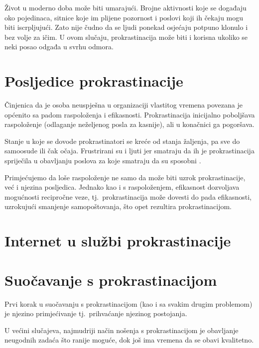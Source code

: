 \documentclass[11pt,twocolumn,english]{article}
\begin{document}
Život u moderno doba može biti umarajući. Brojne aktivnosti koje se
događaju oko pojedinaca, sitnice koje im plijene pozornost i poslovi koji ih
čekaju mogu biti iscrpljujući. Zato nije čudno da se ljudi ponekad osjećaju
potpuno klonulo i bez volje za ičim. U ovom slučaju, prokrastinacija može biti i
korisna ukoliko se neki posao odgađa u svrhu odmora.

\section{Posljedice prokrastinacije}
Činjenica da je osoba neuspješna u organizaciji vlastitog vremena povezana je
općenito sa padom raspoloženja i efikasnosti. Prokrastinacija inicijalno
poboljšava raspoloženje (odlaganje neželjenog posla za kasnije), ali u
konačnici ga pogoršava.

Stanje u koje se dovode prokrastinatori se kreće od
stanja žaljenja, pa sve do samoosude ili čak očaja. Frustrirani su i ljuti jer
smatraju da ih je prokrastinacija spriječila u obavljanju poslova za koje
smatraju da su sposobni \cite{burka2004procrastination}.

Primjećujemo da loše raspoloženje ne samo da može biti
uzrok prokrastinacije, već i njezina posljedica. Jednako kao i s raspoloženjem,
efikasnost dozvoljava mogućnosti recipročne veze, tj.~prokrastinacija može
dovesti do pada efikasnosti, uzrokujući smanjenje samopoštovanja, što opet
rezultira prokrastinacijom.


\section{Internet u službi prokrastinacije}


\section{Suočavanje s prokrastinacijom}

Prvi korak u suočavanju s prokrastinacijom (kao i sa svakim drugim problemom)
je njezino primjećivanje tj.~prihvaćanje njezinog postojanja. 

U većini slučajeva, najmudriji način nošenja s prokrastinacijom je obavljanje
neugodnih zadaća što ranije moguće, dok još ima vremena da se obavi kvalitetno.
\end{document}
